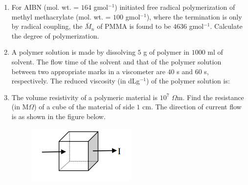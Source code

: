 \documentclass[a4paper,10pt]{article}
\begin{document}
\begin{enumerate}[label=\Alph*)]
    \hfill{}
    \begin{enumerate}[label=\Alph*)]
    \end{enumerate}
    
    \item For AIBN (mol. wt. = $164$ gmol$^{-1}$) initiated free radical polymerization of methyl methacrylate (mol. wt. = $100$ gmol$^{-1}$), where the termination is only by radical coupling, the $\bar{M}_n$ of PMMA is found to be $4636$ gmol$^{-1}$. Calculate the degree of polymerization.
    
    \hfill{}
    
    \item A polymer solution is made by dissolving $5$ g of polymer in $1000$ ml of solvent. The flow time of the solvent and that of the polymer solution between two appropriate marks in a viscometer are $40$ s and $60$ s, respectively. The reduced viscosity (in dLg$^{-1}$) of the polymer solution is:
    
    \hfill{}
    \begin{enumerate}[label=\Alph*)]
    \end{enumerate}
    
    \item The volume resistivity of a polymeric material is $10^7$ $\Omega$m. Find the resistance (in M$\Omega$) of a cube of the material of side $1$ cm. The direction of current flow is as shown in the figure below.
    \begin{figure}[H] \centering \includegraphics[width=0.2\columnwidth]{q22_poly.png} \caption*{} \label{fig:q22_poly} \end{figure}
    
    \hfill{}
\end{enumerate}
\clearpage
\end{document}
